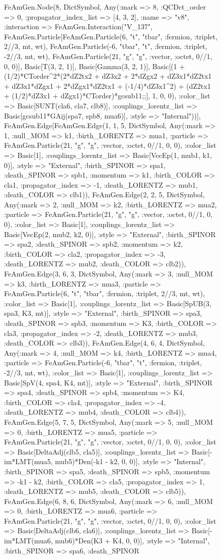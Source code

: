 \documentclass{revtex4}
\begin{document}
\begin{figure}[!htb]
\begin{center}
{FeAmGen.Node(8, Dict{Symbol, Any}(:mark => 8, :QCDct_order => 0, :propagator_index_list => [4, 3, 2], :name => "v8", :interaction => FeAmGen.Interaction("V_137", FeAmGen.Particle[FeAmGen.Particle(6, "t", "tbar", :fermion, :triplet, 2//3, mt, wt), FeAmGen.Particle(-6, "tbar", "t", :fermion, :triplet, -2//3, mt, wt), FeAmGen.Particle(21, "g", "g", :vector, :octet, 0//1, 0, 0)], Basic[T(3, 2, 1)], Basic[Gamma(3, 2, 1)], Basic[(1 + (1/2)*CTorder^2*(2*dZ2tx2 + dZ3x2 + 2*dZgx2 + dZ3x1*dZ2tx1 + dZ3x1*dZgx1 + 2*dZgx1*dZ2tx1 + (-1/4)*dZ3x1^2) + (dZ2tx1 + (1/2)*dZ3x1 + dZgx1)*CTorder)*gcsub11;;], 1, 0, 0), :color_list => Basic[SUNT(cla6, cla7, clb8)], :couplings_lorentz_list => Basic[gcsub11*GAij(spa7, spb8, mua6)], :style => "Internal"))], FeAmGen.Edge[FeAmGen.Edge(1, 1, 5, Dict{Symbol, Any}(:mark => 1, :null_MOM => k1, :birth_LORENTZ => mua1, :particle => FeAmGen.Particle(21, "g", "g", :vector, :octet, 0//1, 0, 0), :color_list => Basic[1], :couplings_lorentz_list => Basic[VecEp(1, mub1, k1, 0)], :style => "External", :birth_SPINOR => spa1, :death_SPINOR => spb1, :momentum => k1, :birth_COLOR => cla1, :propagator_index => -1, :death_LORENTZ => mub1, :death_COLOR => clb1)), FeAmGen.Edge(2, 2, 5, Dict{Symbol, Any}(:mark => 2, :null_MOM => k2, :birth_LORENTZ => mua2, :particle => FeAmGen.Particle(21, "g", "g", :vector, :octet, 0//1, 0, 0), :color_list => Basic[1], :couplings_lorentz_list => Basic[VecEp(2, mub2, k2, 0)], :style => "External", :birth_SPINOR => spa2, :death_SPINOR => spb2, :momentum => k2, :birth_COLOR => cla2, :propagator_index => -3, :death_LORENTZ => mub2, :death_COLOR => clb2)), FeAmGen.Edge(3, 6, 3, Dict{Symbol, Any}(:mark => 3, :null_MOM => k3, :birth_LORENTZ => mua3, :particle => FeAmGen.Particle(6, "t", "tbar", :fermion, :triplet, 2//3, mt, wt), :color_list => Basic[1], :couplings_lorentz_list => Basic[SpUB(3, spa3, K3, mt)], :style => "External", :birth_SPINOR => spa3, :death_SPINOR => spb3, :momentum => K3, :birth_COLOR => cla3, :propagator_index => -2, :death_LORENTZ => mub3, :death_COLOR => clb3)), FeAmGen.Edge(4, 6, 4, Dict{Symbol, Any}(:mark => 4, :null_MOM => k4, :birth_LORENTZ => mua4, :particle => FeAmGen.Particle(-6, "tbar", "t", :fermion, :triplet, -2//3, mt, wt), :color_list => Basic[1], :couplings_lorentz_list => Basic[SpV(4, spa4, K4, mt)], :style => "External", :birth_SPINOR => spa4, :death_SPINOR => spb4, :momentum => K4, :birth_COLOR => cla4, :propagator_index => -4, :death_LORENTZ => mub4, :death_COLOR => clb4)), FeAmGen.Edge(5, 7, 5, Dict{Symbol, Any}(:mark => 5, :null_MOM => 0, :birth_LORENTZ => mua5, :particle => FeAmGen.Particle(21, "g", "g", :vector, :octet, 0//1, 0, 0), :color_list => Basic[DeltaAdj(clb5, cla5)], :couplings_lorentz_list => Basic[-im*LMT(mua5, mub5)*Den(-k1 - k2, 0, 0)], :style => "Internal", :birth_SPINOR => spa5, :death_SPINOR => spb5, :momentum => -k1 - k2, :birth_COLOR => cla5, :propagator_index => 1, :death_LORENTZ => mub5, :death_COLOR => clb5)), FeAmGen.Edge(6, 8, 6, Dict{Symbol, Any}(:mark => 6, :null_MOM => 0, :birth_LORENTZ => mua6, :particle => FeAmGen.Particle(21, "g", "g", :vector, :octet, 0//1, 0, 0), :color_list => Basic[DeltaAdj(clb6, cla6)], :couplings_lorentz_list => Basic[-im*LMT(mua6, mub6)*Den(K3 + K4, 0, 0)], :style => "Internal", :birth_SPINOR => spa6, :death_SPINOR }
\end{center}
\end{figure}
\end{document}

